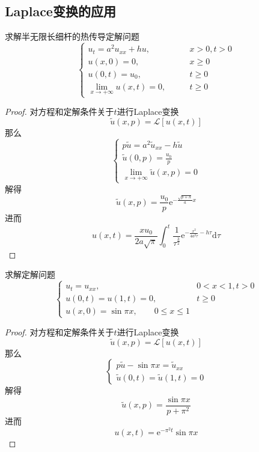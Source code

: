 \documentclass[lang = cn, scheme = chinese, thmcnt = section]{elegantbook}
\newcommand{\dd}{\mathrm{d}}           %
\newcommand{\ee}[1]{\mathrm{e}^{#1}}   %
\begin{document}
\subsection{Laplace变换的应用}

\begin{example}
	求解半无限长细杆的热传导定解问题
	$$
	\begin{cases}
		u_t=a^2u_{xx}+hu,\qquad & x>0,t>0\\
		u(x,0)=0,\qquad & x\ge 0\\
		u(0,t)=u_0,\qquad & t\ge 0\\
		\lim\limits_{x\to+\infty}u(x,t)=0,\qquad & t\ge 0
	\end{cases}
	$$
\end{example}

\begin{proof}
	对方程和定解条件关于$t$进行Laplace变换%
	$$
	\tilde{u}(x,p)=\mathscr{L}[u(x,t)]
	$$
	那么%
	$$
	\begin{cases}
		p\tilde{u}=a^2\tilde{u}_{xx}-h\tilde{u}\\
		\tilde{u}(0,p)=\frac{u_0}{p}\\
		\lim\limits_{x\to+\infty}\tilde{u}(x,p)=0
	\end{cases}
	$$
	解得%
	$$
	\tilde{u}(x,p)=\frac{u_0}{p}\ee{-\frac{\sqrt{p+h}}{a}x}
	$$
	进而%
	$$
	u(x,t)=
	\frac{xu_0}{2a\sqrt{\pi}}\int_{0}^{t}\frac{1}{\tau^{\frac{3}{2}}}\ee{-\frac{x^2}{4a^2\tau}-h\tau}\dd\tau
	$$
\end{proof}

\begin{example}
	求解定解问题
	$$
	\begin{cases}
		u_t=u_{xx},\qquad & 0<x<1,t>0\\
		u(0,t)=u(1,t)=0,\qquad & t\ge 0\\
		u(x,0)=\sin\pi x,\qquad 0\le x \le 1
	\end{cases}
	$$
\end{example}

\begin{proof}
	对方程和定解条件关于$t$进行Laplace变换%
	$$
	\tilde{u}(x,p)=\mathscr{L}[u(x,t)]
	$$
	那么%
	$$
	\begin{cases}
		p\tilde{u}-\sin\pi x=\tilde{u}_{xx}\\
		\tilde{u}(0,t)=\tilde{u}(1,t)=0
	\end{cases}
	$$
	解得%
	$$
	\tilde{u}(x,p)=\frac{\sin\pi x}{p+\pi^2}
	$$
	进而%
	$$
	u(x,t)=
	\ee{-\pi^2t}\sin\pi x
	$$
\end{proof}
\end{document}
